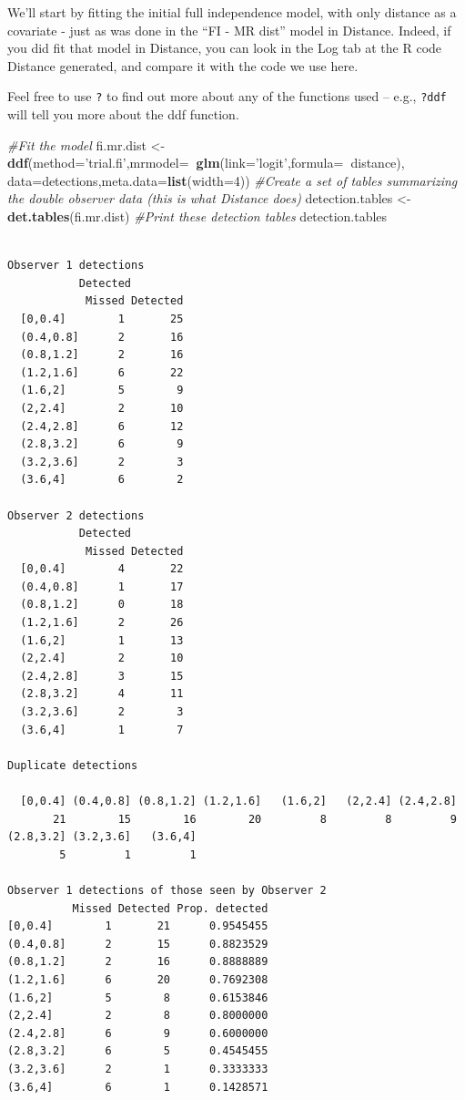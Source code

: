 \documentclass[]{book}
\newenvironment{Shaded}{\begin{snugshade}}{\end{snugshade}}
\newcommand{\KeywordTok}[1]{\textcolor[rgb]{0.13,0.29,0.53}{\textbf{#1}}}
\newcommand{\DataTypeTok}[1]{\textcolor[rgb]{0.13,0.29,0.53}{#1}}
\newcommand{\DecValTok}[1]{\textcolor[rgb]{0.00,0.00,0.81}{#1}}
\newcommand{\StringTok}[1]{\textcolor[rgb]{0.31,0.60,0.02}{#1}}
\newcommand{\CommentTok}[1]{\textcolor[rgb]{0.56,0.35,0.01}{\textit{#1}}}
\newcommand{\OperatorTok}[1]{\textcolor[rgb]{0.81,0.36,0.00}{\textbf{#1}}}
\newcommand{\NormalTok}[1]{#1}
\theoremstyle{definition}
\theoremstyle{definition}
\theoremstyle{remark}
\begin{document}
We'll start by fitting the initial full independence model, with only
distance as a covariate - just as was done in the ``FI - MR dist'' model
in Distance. Indeed, if you did fit that model in Distance, you can look
in the Log tab at the R code Distance generated, and compare it with the
code we use here.

Feel free to use \texttt{?} to find out more about any of the functions
used -- e.g., \texttt{?ddf} will tell you more about the ddf function.

\begin{Shaded}
\begin{Highlighting}[]
\CommentTok{#Fit the model}
\NormalTok{fi.mr.dist <-}\StringTok{ }\KeywordTok{ddf}\NormalTok{(}\DataTypeTok{method=}\StringTok{'trial.fi'}\NormalTok{,}\DataTypeTok{mrmodel=}\OperatorTok{~}\KeywordTok{glm}\NormalTok{(}\DataTypeTok{link=}\StringTok{'logit'}\NormalTok{,}\DataTypeTok{formula=}\OperatorTok{~}\NormalTok{distance),}
                \DataTypeTok{data=}\NormalTok{detections,}\DataTypeTok{meta.data=}\KeywordTok{list}\NormalTok{(}\DataTypeTok{width=}\DecValTok{4}\NormalTok{))}
\CommentTok{#Create a set of tables summarizing the double observer data (this is what Distance does)}
\NormalTok{detection.tables <-}\StringTok{ }\KeywordTok{det.tables}\NormalTok{(fi.mr.dist)}
\CommentTok{#Print these detection tables}
\NormalTok{detection.tables}
\end{Highlighting}
\end{Shaded}

\begin{verbatim}

Observer 1 detections
           Detected
            Missed Detected
  [0,0.4]        1       25
  (0.4,0.8]      2       16
  (0.8,1.2]      2       16
  (1.2,1.6]      6       22
  (1.6,2]        5        9
  (2,2.4]        2       10
  (2.4,2.8]      6       12
  (2.8,3.2]      6        9
  (3.2,3.6]      2        3
  (3.6,4]        6        2

Observer 2 detections
           Detected
            Missed Detected
  [0,0.4]        4       22
  (0.4,0.8]      1       17
  (0.8,1.2]      0       18
  (1.2,1.6]      2       26
  (1.6,2]        1       13
  (2,2.4]        2       10
  (2.4,2.8]      3       15
  (2.8,3.2]      4       11
  (3.2,3.6]      2        3
  (3.6,4]        1        7

Duplicate detections

  [0,0.4] (0.4,0.8] (0.8,1.2] (1.2,1.6]   (1.6,2]   (2,2.4] (2.4,2.8] 
       21        15        16        20         8         8         9 
(2.8,3.2] (3.2,3.6]   (3.6,4] 
        5         1         1 

Observer 1 detections of those seen by Observer 2
          Missed Detected Prop. detected
[0,0.4]        1       21      0.9545455
(0.4,0.8]      2       15      0.8823529
(0.8,1.2]      2       16      0.8888889
(1.2,1.6]      6       20      0.7692308
(1.6,2]        5        8      0.6153846
(2,2.4]        2        8      0.8000000
(2.4,2.8]      6        9      0.6000000
(2.8,3.2]      6        5      0.4545455
(3.2,3.6]      2        1      0.3333333
(3.6,4]        6        1      0.1428571
\end{verbatim}
\end{document}
